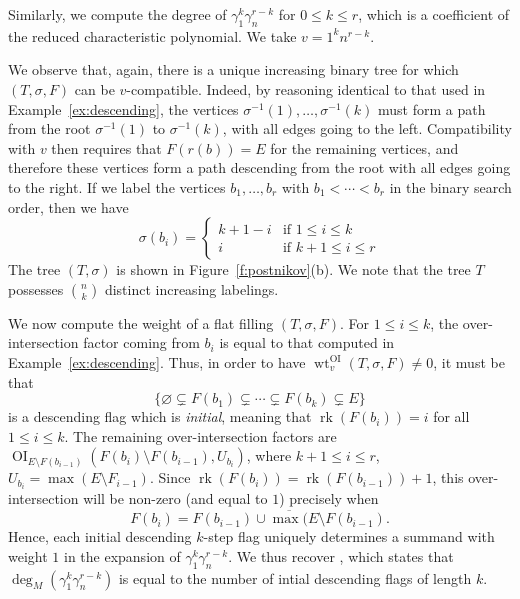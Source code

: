 \documentclass[ALCO,published]{cedram}
\numberwithin{equation}{section}
\numberwithin{figure}{section}
\DeclareMathOperator{\OI}{OI}
\DeclareMathOperator{\wt}{wt}
\DeclareMathOperator{\rk}{rk}
\begin{document}
\begin{exam}
Similarly, we compute the degree of $\gamma_1^k \gamma_n^{r-k}$ for $0\leq k\leq r$, which is a coefficient of the reduced characteristic polynomial. We take $v = 1^k n^{r-k}$.

We observe that, again, there is a unique increasing binary tree for which $(T,\sigma,F)$ can be $v$-compatible. Indeed, by reasoning identical to that used in Example~\ref{ex:descending}, the vertices $\sigma^{-1}(1), \ldots, \sigma^{-1}(k)$ must form a path from the root $\sigma^{-1}(1)$ to $\sigma^{-1}(k)$, with all edges going to the left. Compatibility with $v$ then requires that $F(r(b)) = E$ for the remaining vertices, and therefore these vertices form a path descending from the root with all edges going to the right. If we label the vertices $b_1,\ldots, b_r$ with $b_1 < \cdots < b_r$ in the binary search order, then we have
\[ \sigma(b_i) =
\begin{cases}
	k+1-i & \text{if } 1 \leq i \leq k \\
	i & \text{if } k+1 \leq i \leq r
\end{cases}
\]
The tree $(T,\sigma)$ is shown in Figure~\ref{f:postnikov}(b). We note that the tree $T$ possesses $\binom{n}{k}$ distinct increasing labelings. %

We now compute the weight of a flat filling $(T,\sigma,F)$. For $1 \leq i \leq k$, the over-intersection factor coming from $b_i$ is equal to that computed in Example~\ref{ex:descending}. Thus, in order to have $\wt^{\OI}_v(T,\sigma,F) \neq 0$, it must be that
\[ \{ \varnothing \subsetneq F(b_1) \subsetneq \cdots \subsetneq F(b_k) \subsetneq E \} \]
is a descending flag which is {\em initial}, meaning that $\rk(F(b_i)) = i$ for all $1 \leq i \leq k$. The remaining over-intersection factors are $\OI_{E \setminus F(b_{i-1})}(F(b_i) \setminus F(b_{i-1}), U_{b_i})$, where $k+1 \leq i \leq r$, $U_{b_i}=\max(E \setminus F_{i-1})$. Since $\rk(F(b_i)) = \rk(F(b_{i-1})) + 1$, this over-intersection will be non-zero (and equal to $1$) precisely when 
\[F(b_i)=\overline{F(b_{i-1}) \cup \max(E \setminus F(b_{i-1})}.\]
Hence, each initial descending $k$-step flag uniquely determines a summand with weight $1$ in the expansion of $\gamma_1^k \gamma_n^{r-k}$. We thus recover \cite[Proposition~9.5]{AHK}, which states that $\deg_M(\gamma_1^k \gamma_n^{r-k})$ is equal to the number of intial descending flags of length $k$.
\end{exam}
\end{document}
